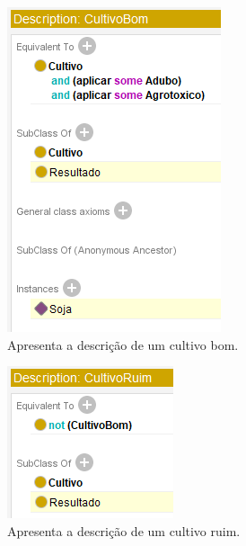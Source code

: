 \documentclass{article}
\begin{document}
     \begin{figure}[!htp]
        \centering %
        \includegraphics[width=.5\textwidth]{imagens/Inf_4.png} %
        \caption{Apresenta a descrição de um cultivo bom.}
        \label{figura:descCultivoBom}
    \end{figure}
     
     \begin{figure}[!htp]
        \centering %
        \includegraphics[width=.5\textwidth]{imagens/Inf_5.png} %
        \caption{Apresenta a descrição de um cultivo ruim.}
        \label{figura:descCultivoRuim}
    \end{figure}
    
\end{document}
